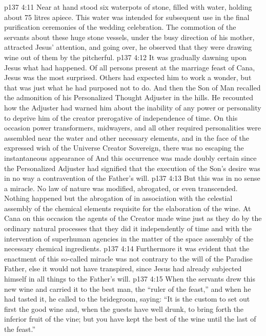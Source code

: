 \vs p137 4:11 Near at hand stood six waterpots of stone, filled with water, holding about 75 litres apiece. This water was intended for subsequent use in the final purification ceremonies of the wedding celebration. The commotion of the servants about these huge stone vessels, under the busy direction of his mother, attracted Jesus’ attention, and going over, he observed that they were drawing wine out of them by the pitcherful.
\vs p137 4:12 It was gradually dawning upon Jesus what had happened. Of all persons present at the marriage feast of Cana, Jesus was the most surprised. Others had expected him to work a wonder, but that was just what he had purposed not to do. And then the Son of Man recalled the admonition of his Personalized Thought Adjuster in the hills. He recounted how the Adjuster had warned him about the inability of any power or personality to deprive him of the creator prerogative of independence of time. On this occasion power transformers, midwayers, and all other required personalities were assembled near the water and other necessary elements, and in the face of the expressed wish of the Universe Creator Sovereign, there was no escaping the instantaneous appearance of  And this occurrence was made doubly certain since the Personalized Adjuster had signified that the execution of the Son’s desire was in no way a contravention of the Father’s will.
\vs p137 4:13 But this was in no sense a miracle. No law of nature was modified, abrogated, or even transcended. Nothing happened but the abrogation of  in association with the celestial assembly of the chemical elements requisite for the elaboration of the wine. At Cana on this occasion the agents of the Creator made wine just as they do by the ordinary natural processes  that they did it independently of time and with the intervention of superhuman agencies in the matter of the space assembly of the necessary chemical ingredients.
\vs p137 4:14 Furthermore it was evident that the enactment of this so\hyp{}called miracle was not contrary to the will of the Paradise Father, else it would not have transpired, since Jesus had already subjected himself in all things to the Father’s will.
\vs p137 4:15 \pc When the servants drew this new wine and carried it to the best man, the “ruler of the feast,” and when he had tasted it, he called to the bridegroom, saying: “It is the custom to set out first the good wine and, when the guests have well drunk, to bring forth the inferior fruit of the vine; but you have kept the best of the wine until the last of the feast.”
